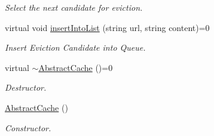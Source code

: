 \begin{DoxyCompactItemize}
\begin{DoxyCompactList}\small\item\em \-Select the next candidate for eviction. \end{DoxyCompactList}\item 
\hypertarget{classAbstractCache_a910756174d1ee21eac16a4be3f7c881a}{virtual void \hyperlink{classAbstractCache_a910756174d1ee21eac16a4be3f7c881a}{insert\-Into\-List} (string url, string content)=0}\label{classAbstractCache_a910756174d1ee21eac16a4be3f7c881a}

\begin{DoxyCompactList}\small\item\em \-Insert \-Eviction \-Candidate into \-Queue. \end{DoxyCompactList}\item 
\hypertarget{classAbstractCache_aa5ae534cc8719753df92cec13f400f8b}{virtual \hyperlink{classAbstractCache_aa5ae534cc8719753df92cec13f400f8b}{$\sim$\-Abstract\-Cache} ()=0}\label{classAbstractCache_aa5ae534cc8719753df92cec13f400f8b}

\begin{DoxyCompactList}\small\item\em \-Destructor. \end{DoxyCompactList}\item 
\hypertarget{classAbstractCache_a3a1cb850c9d9db8a4dd42744e1756da4}{\hyperlink{classAbstractCache_a3a1cb850c9d9db8a4dd42744e1756da4}{\-Abstract\-Cache} ()}\label{classAbstractCache_a3a1cb850c9d9db8a4dd42744e1756da4}

\begin{DoxyCompactList}\small\item\em \-Constructor. \end{DoxyCompactList}\end{DoxyCompactItemize}
